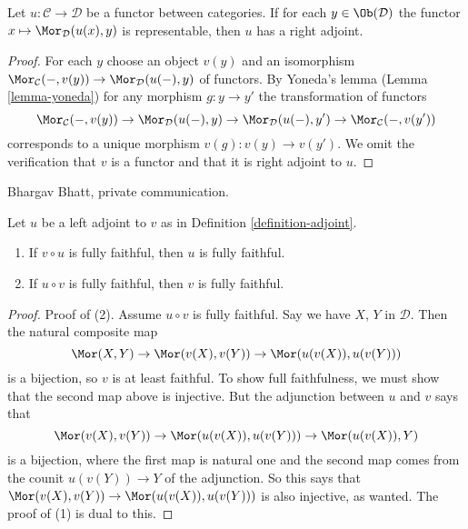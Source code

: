 \begin{lemma}
\label{lemma-adjoint-exists}
Let $u : \mathcal{C} \to \mathcal{D}$ be a functor between categories.
If for each $y \in \Ob(\mathcal{D})$ the functor
$x \mapsto \Mor_\mathcal{D}(u(x), y)$ is representable, then
$u$ has a right adjoint.
\end{lemma}

\begin{proof}
For each $y$ choose an object $v(y)$ and an isomorphism
$\Mor_\mathcal{C}(-, v(y)) \to \Mor_\mathcal{D}(u(-), y)$
of functors. By Yoneda's lemma (Lemma \ref{lemma-yoneda})
for any morphism $g : y \to y'$ the transformation of functors
$$
\Mor_\mathcal{C}(-, v(y)) \to \Mor_\mathcal{D}(u(-), y) \to
\Mor_\mathcal{D}(u(-), y') \to \Mor_\mathcal{C}(-, v(y'))
$$
corresponds to a unique morphism $v(g) : v(y) \to v(y')$.
We omit the verification that $v$ is a functor and that
it is right adjoint to $u$.
\end{proof}

\begin{lemma}
\label{lemma-left-adjoint-composed-fully-faithful}
\begin{reference}
Bhargav Bhatt, private communication.
\end{reference}
Let $u$ be a left adjoint to $v$ as in Definition \ref{definition-adjoint}.
\begin{enumerate}
\item If $v \circ u$ is fully faithful, then $u$ is fully faithful.
\item If $u \circ v$ is fully faithful, then $v$ is fully faithful.
\end{enumerate}
\end{lemma}

\begin{proof}
Proof of (2). Assume $u \circ v$ is fully faithful.
Say we have $X$, $Y$ in $\mathcal{D}$.
Then the natural composite map
$$
\Mor(X,Y) \to \Mor(v(X),v(Y)) \to \Mor(u(v(X)), u(v(Y)))
$$
is a bijection, so $v$ is at least faithful. To show full faithfulness,
we must show that the second map above is injective.
But the adjunction between $u$ and $v$ says that
$$
\Mor(v(X), v(Y)) \to \Mor(u(v(X)), u(v(Y))) \to \Mor(u(v(X)), Y)
$$
is a bijection, where the first map is natural one and
the second map comes from the counit $u(v(Y)) \to Y$ of the adjunction.
So this says that
$\Mor(v(X), v(Y)) \to \Mor(u(v(X)), u(v(Y)))$
is also injective, as wanted. The proof of (1) is dual to this.
\end{proof}

